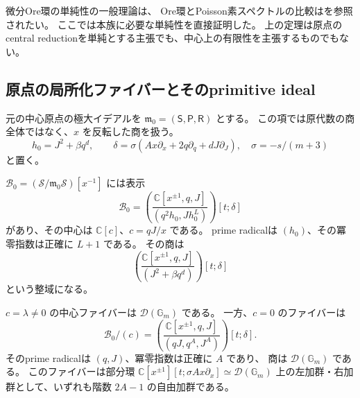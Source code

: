 微分Ore環の単純性の一般理論は\cite{ORS2013}、
Ore環とPoisson素スペクトルの比較は\cite{JordanOre2014}を参照されたい。
ここでは本族に必要な単純性を直接証明した。
上の定理は原点のcentral reductionを単純とする主張でも、中心上の有限性を主張するものでもない。

\subsection{原点の局所化ファイバーとそのprimitive ideal}

元の中心原点の極大イデアルを $\mathfrak m_0=(\mathsf S,\mathsf P,\mathsf R)$ とする。
この項では原代数の商全体ではなく、$x$ を反転した商を扱う。
\[
 h_0=J^2+\beta q^d,\qquad
 \delta=\sigma(Ax\partial_x+2q\partial_q+dJ\partial_J),
 \quad \sigma=-s/(m+3)
\]
と置く。

\begin{proposition}[原点に現れる局所化後の厚み]
\label{prop:localized-origin-v35}
$\mathcal B_0=(\mathcal S/\mathfrak m_0\mathcal S)[x^{-1}]$ には表示
\[
 \boxed{
 \mathcal B_0=
 \left(\frac{\mathbb C[x^{\pm1},q,J]}
                    {(q^2h_0,Jh_0^L)}\right)[t;\delta]
 }
\]
があり、その中心は $\mathbb C[c]$、$c=qJ/x$ である。
prime radicalは $(h_0)$、その冪零指数は正確に $L+1$ である。
その商は
\[
 \left(\frac{\mathbb C[x^{\pm1},q,J]}{(J^2+\beta q^d)}\right)[t;\delta]
\]
という整域になる。

$c=\lambda\ne0$ の中心ファイバーは $\mathcal D(\mathbb G_m)$ である。
一方、$c=0$ のファイバーは
\[
 \boxed{
 \mathcal B_0/(c)=
 \left(\frac{\mathbb C[x^{\pm1},q,J]}{(qJ,q^A,J^A)}\right)[t;\delta].
 }
\]
そのprime radicalは $(q,J)$、冪零指数は正確に $A$ であり、
商は $\mathcal D(\mathbb G_m)$ である。
このファイバーは部分環
$\mathbb C[x^{\pm1}][t;\sigma Ax\partial_x]\simeq\mathcal D(\mathbb G_m)$
上の左加群・右加群として、いずれも階数 $2A-1$ の自由加群である。
\end{proposition}

